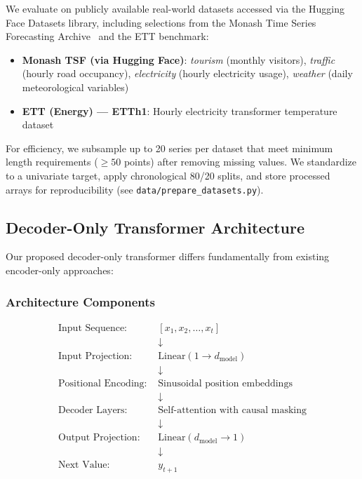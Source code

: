 \documentclass[11pt]{article}
\begin{document}
We evaluate on publicly available real-world datasets accessed via the Hugging Face Datasets library, including selections from the Monash Time Series Forecasting Archive~\cite{godahewa2021monash} and the ETT benchmark:

\begin{itemize}
\item \textbf{Monash TSF (via Hugging Face)}: \emph{tourism} (monthly visitors), \emph{traffic} (hourly road occupancy), \emph{electricity} (hourly electricity usage), \emph{weather} (daily meteorological variables)
\item \textbf{ETT (Energy) — ETTh1}: Hourly electricity transformer temperature dataset
\end{itemize}

For efficiency, we subsample up to 20 series per dataset that meet minimum length requirements (\(\geq 50\) points) after removing missing values. We standardize to a univariate target, apply chronological 80/20 splits, and store processed arrays for reproducibility (see \texttt{data/prepare\_datasets.py}).

\subsection{Decoder-Only Transformer Architecture}

Our proposed decoder-only transformer differs fundamentally from existing encoder-only approaches:

\subsubsection{Architecture Components}

\begin{align}
\text{Input Sequence: } &[x_1, x_2, \ldots, x_t] \nonumber\\
&\downarrow \nonumber\\
\text{Input Projection: } &\text{Linear}(1 \to d_{\text{model}}) \nonumber\\
&\downarrow \nonumber\\
\text{Positional Encoding: } &\text{Sinusoidal position embeddings} \nonumber\\
&\downarrow \nonumber\\
\text{Decoder Layers: } &\text{Self-attention with causal masking} \nonumber\\
&\downarrow \nonumber\\
\text{Output Projection: } &\text{Linear}(d_{\text{model}} \to 1) \nonumber\\
&\downarrow \nonumber\\
\text{Next Value: } &y_{t+1} \nonumber
\end{align}
\end{document}
